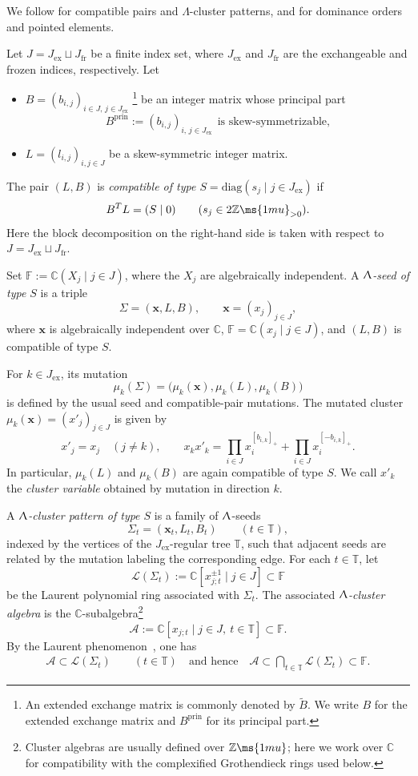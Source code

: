 \documentclass[12pt, leqno]{amsart}
\numberwithin{equation}{section}
\theoremstyle{plain}
\theoremstyle{definition}
\newcommand{\seteq}{\mathbin{:=}}
\newcommand{\ex}{\mathrm{ex}}
\newcommand{\fr}{\mathrm{fr}}
\newcommand{\C}{\mathbb{C}}
\newcommand{\Z}{\mathbb{Z}\ms{1mu}}
\newcommand{\bbF}{\mathbb{F}}
\newcommand{\bbT}{\mathbb{T}}
\newcommand{\bfx}{\mathbf{x}}
\newcommand{\calA}{\mathcal{A}}
\newcommand{\calL}{\mathcal{L}}
\newcommand{\diag}{\mathrm{diag}}
\newcommand{\qtqh}[1][{and hence}]{\quad\text{{#1}}\quad}
\newcommand{\bitem}{\begin{itemize}}
\newcommand{\eitem}{\end{itemize}}
\begin{document}
We follow \cite{FZ02,BZ05,FWZ1} for compatible
pairs and \(\Lambda\)-cluster patterns, and
\cite{Qin17,Cao23,KK19,KKOP23F} for dominance orders and pointed elements.

Let \(J=J_{\ex}\sqcup J_{\fr}\) be a finite index set, where
\(J_{\ex}\) and \(J_{\fr}\) are the exchangeable and frozen indices,
respectively. Let 
\bitem
\item $B=(b_{i,j})_{i\in J,\,j\in J_{\ex}}$ \footnote{An extended
exchange matrix is commonly denoted by \( \widetilde B \).  We write
\(B\) for the extended exchange matrix and \(B^{\mathrm{prin}}\) for its principal part.}
be an integer matrix whose principal part
\[
B^{\mathrm{prin}} \seteq
(b_{i,j})_{i,\,j\in J_{\ex}} \ \ \text{is skew-symmetrizable,}
\]

\item  $L=(l_{i,j})_{i,j\in J}$ be a skew-symmetric integer matrix.  
\eitem 
The pair \((L,B)\) is
\emph{compatible of type \(S=\diag(s_j\mid j\in J_{\ex})\)} if
\begin{equation}\label{eq: compatible pair}
B^{T}L=(S\mid0) \qquad   (s_j\in2\Z_{>0}).
\end{equation}
Here the block decomposition on the right-hand side is taken with
respect to \(J=J_{\ex}\sqcup J_{\fr}\).


Set $\bbF\seteq\C(X_j\mid j\in J)$, where the \(X_j\) are algebraically independent.  A \emph{\(\Uplambda\)-seed of type \(S\)} is a triple
\[
\Sigma=(\bfx,L,B), \qquad \bfx=(x_j)_{j\in J},
\]
where \(\bfx\) is algebraically independent over \(\C\),
\(\bbF=\C(x_j\mid j\in J)\), and \((L,B)\) is compatible of type \(S\). 

For \(k\in J_{\ex}\), its mutation
\[
\mu_k(\Sigma) = \bigl(\mu_k(\bfx),\mu_k(L),\mu_k(B)\bigr)
\]
is defined by the usual seed and compatible-pair mutations.  The
mutated cluster \(\mu_k(\bfx)=(x'_j)_{j\in J}\) is given by
\[
x'_j=x_j\quad(j\ne k), \qquad
x_kx'_k = \prod_{i\in J}x_i^{[b_{i,k}]_+} + \prod_{i\in J}x_i^{[-b_{i,k}]_+}.
\]
In particular, \(\mu_k(L)\) and \(\mu_k(B)\) are again compatible
of type \(S\). We call \(x'_k\) the \emph{cluster variable} obtained by mutation in
direction \(k\).

A \emph{\(\Uplambda\)-cluster pattern of type \(S\)} is a family of
\(\Uplambda\)-seeds
\[
\Sigma_t=(\bfx_t,L_t,B_t) \qquad(t\in\bbT),
\]
indexed by the vertices of the \(J_{\ex}\)-regular tree \(\bbT\),
such that adjacent seeds are related by the mutation labeling the
corresponding edge.  For each \(t\in\bbT\), let
\[
\calL(\Sigma_t) \seteq \C[x_{j;t}^{\pm1}\mid j\in J] \subset\bbF
\]
be the Laurent polynomial ring associated with \(\Sigma_t\).
The associated \emph{\(\Uplambda\)-cluster algebra} is the
\(\C\)-subalgebra\footnote{Cluster algebras are usually defined over
\(\Z\); here we work over \(\C\) for compatibility with the
complexified Grothendieck rings used below.}
\[
\calA \seteq \C[x_{j;t}\mid j\in J,\ t\in\bbT] \subset\bbF.
\]
By the Laurent phenomenon~\cite{FZ02}, one has
\begin{align} \label{eq: Laurent phe}
\calA\subset\calL(\Sigma_t) \qquad(t\in\bbT) 
\qtqh 
\calA \subset  \bigcap_{t\in\bbT}\calL(\Sigma_t) \subset\bbF.
\end{align}
\end{document}
